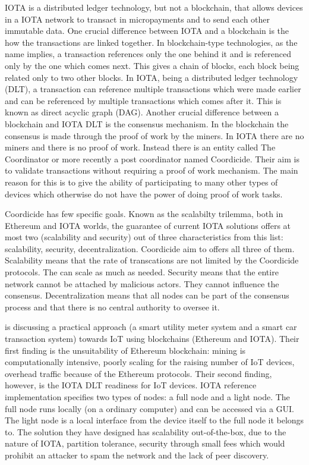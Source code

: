 \documentclass[a4paper,12pt,twoside]{book}
\begin{document}
    IOTA is a distributed ledger technology, but not a blockchain, that allows devices in a IOTA network to transact in micropayments and to send each other immutable data. One crucial difference between IOTA and a blockchain is the how the transactions are linked together. In blockchain-type technologies, as the name implies, a transaction references only the one behind it and is referenced only by the one which comes next. This gives a chain of blocks, each block being related only to two other blocks. In IOTA, being a distributed ledger technology (DLT), a transaction can reference multiple transactions which were made earlier and can be referenced by multiple transactions which comes after it. This is known as direct acyclic graph (DAG). Another crucial difference between a blockchain and IOTA DLT is the consensus mechanism. In the blockchain the consensus is made through the proof of work by the miners. In IOTA there are no miners and there is no proof of work. Instead there is an entity called The Coordinator or more recently a post coordinator named Coordicide. Their aim is to validate transactions without requiring a proof of work mechanism. The main reason for this is to give the ability of participating to many other types of devices which otherwise do not have the power of doing proof of work tasks.

    Coordicide has few specific goals. Known as the scalabilty trilemma, both in Ethereum and IOTA worlds, the guarantee of current IOTA solutions offers at most two (scalability and security) out of three characteristics from this list: scalability, security, decentralization. Coordicide aim to offers all three of them. Scalability means that the rate of transcations are not limited by the Coordicide protocols. The can scale as much as needed. Security means that the entire network cannot be attached by malicious actors. They cannot influence the consensus. Decentralization means that all nodes can be part of the consensus process and that there is no central authority to oversee it.

    \cite{EnhancingIoTSecurityIOTA} is discussing a practical approach (a smart utility meter system and a smart car transaction system) towards IoT using blockchains (Ethereum and IOTA). Their first finding is the unsuitability of Ethereum blockchain: mining is computationally intensive, poorly scaling for the raising number of IoT devices, overhead traffic because of the Ethereum protocols. Their second finding, however, is the IOTA DLT readiness for IoT devices. IOTA reference implementation specifies two types of nodes: a full node and a light node. The full node runs locally (on a ordinary computer) and can be accessed via a GUI. The light node is a local interface from the device itself to the full node it belongs to. The solution they have designed has scalability out-of-the-box, due to the nature of IOTA, partition tolerance, security through small fees which would prohibit an attacker to spam the network and the lack of peer discovery.
    
\end{document}
